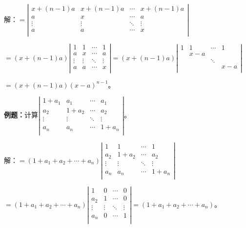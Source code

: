 \documentclass[UTF8, 12pt]{ctexart}
\begin{document}
解：$=\left|\begin{array}{cccc} 
    x+(n-1)a & x+(n-1)a & \cdots & x+(n-1)a \\
    a & x & \cdots & a \\
    \vdots & \vdots & \ddots & \vdots \\
    a & a & \cdots & x \\
\end{array}\right|$

$=(x+(n-1)a)\left|\begin{array}{cccc} 
    1 & 1 & \cdots & 1 \\
    a & x & \cdots & a \\
    \vdots & \vdots & \ddots & \vdots \\
    a & a & \cdots & x \\
\end{array}\right|=(x+(n-1)a)\left|\begin{array}{cccc} 
    1 & 1 & \cdots & 1 \\
     & x-a & &  \\
     & & \ddots & \\
     & & & x-a \\
\end{array}\right|$

$=(x+(n-1)a)(x-a)^{n-1}$。

\textbf{例题：}计算$\left|\begin{array}{cccc} 
    1+a_1 & a_1 & \cdots & a_1 \\
    a_2 & 1+a_2 & \cdots & a_2 \\
    \vdots & \vdots & \ddots & \vdots \\
    a_n & a_n & \cdots & 1+a_n \\
\end{array}\right|$。

解：$=(1+a_1+a_2+\cdots+a_n)\left|\begin{array}{cccc} 
    1 & 1 & \cdots & 1 \\
    a_2 & 1+a_2 & \cdots & a_2 \\
    \vdots & \vdots & \ddots & \vdots \\
    a_n & a_n & \cdots & 1+a_n \\
\end{array}\right|$

$=(1+a_1+a_2+\cdots+a_n)\left|\begin{array}{cccc} 
    1 & 0 & \cdots & 0 \\
    a_2 & 1 & \cdots & 0 \\
    \vdots & \vdots & \ddots & \vdots \\
    a_n & 0 & \cdots & 1 \\
\end{array}\right|=(1+a_1+a_2+\cdots+a_n)$。
\end{document}
